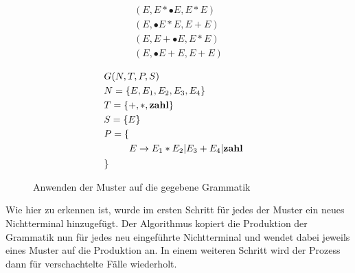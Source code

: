\documentclass[runningheads]{llncs}
\begin{document}
	\begin{figure}
		\begin{minipage}{0.48\textwidth}
			\begin{flushleft}
				\begin{align*}
				(E, E*\bullet{E}, E*E)
					\\
					(E, \bullet{E}*E, E+E) \\
					(E, E+\bullet{E}, E*E) \\
					(E, \bullet{E}+E, E+E)
				\end{align*}
			\end{flushleft}
		\end{minipage}
		\hfill
		\begin{minipage}{0.48\textwidth}
			\begin{align*}
				& G(N,T,P,S) \\
				& N = \{E, E_1, E_2, E_3, E_4\} \\
				& T = \{+, *, \bold{zahl}\} \\
				& S = \{E\} \\
				& P = \{ \begin{aligned}[t]
					         \\
					         E &\rightarrow E_1 * E_2 | E_3 + E_4 | \bold{zahl} \\
				\end{aligned} \\
				& \}
			\end{align*}
		\end{minipage}
		\caption{Anwenden der Muster auf die gegebene Grammatik}
		\label{fig:figure8}
	\end{figure}

	Wie hier zu erkennen ist, wurde im ersten Schritt für jedes der Muster ein neues Nichtterminal hinzugefügt.
	Der Algorithmus kopiert die Produktion der Grammatik nun für jedes neu eingeführte Nichtterminal
	und wendet dabei jeweils eines Muster auf die Produktion an.
	In einem weiteren Schritt wird der Prozess dann für verschachtelte Fälle wiederholt.
\end{document}
